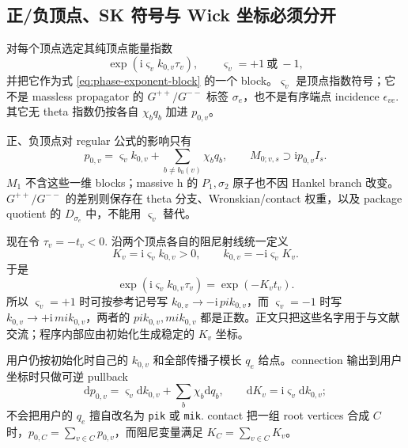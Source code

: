 \documentclass[11pt,a4paper]{ctexart}
\newcommand{\dd}{\mathrm d}
\newcommand{\ii}{\mathrm i}
\begin{document}
\subsection{正/负顶点、SK 符号与 Wick 坐标必须分开}

对每个顶点选定其纯顶点能量指数
\begin{equation}
 \exp(\ii\varsigma_vk_{0,v}\tau_v),
 \qquad \varsigma_v=+1\ \text{或}\ -1,
 \label{eq:vertex-phase-sign}
\end{equation}
并把它作为式 \eqref{eq:phase-exponent-block} 的一个 block。$\varsigma_v$ 是顶点指数符号；它不是 massless propagator 的 $G^{++}/G^{--}$ 标签 $\sigma_e$，也不是有序端点 incidence $\epsilon_{ve}$. 其它无 theta 指数仍按各自 $\chi_bq_b$ 加进 $p_{0,v}$。

正、负顶点对 regular 公式的影响只有
\begin{equation}
 p_{0,v}=\varsigma_vk_{0,v}+\sum_{b\neq b_0(v)}\chi_bq_b,
 \qquad
 M_{0;v,s}\supset\ii p_{0,v}I_s.
 \label{eq:signed-vertex-M0}
\end{equation}
$M_1$ 不含这些一维 blocks；massive h 的 $P_1,\sigma_2$ 原子也不因 Hankel branch 改变。$G^{++}/G^{--}$ 的差别则保存在 theta 分支、Wronskian/contact 权重，以及 package quotient 的 $D_{\sigma_e}$ 中，不能用 $\varsigma_v$ 替代。

现在令 $\tau_v=-t_v<0$. 沿两个顶点各自的阻尼射线统一定义
\begin{equation}
 K_v=\ii\varsigma_vk_{0,v}>0,
 \qquad
 k_{0,v}=-\ii\varsigma_vK_v.
 \label{eq:unified-vertex-wick-coordinate}
\end{equation}
于是
\begin{equation}
 \exp(\ii\varsigma_vk_{0,v}\tau_v)=\exp(-K_vt_v).
\end{equation}
所以 $\varsigma_v=+1$ 时可按参考记号写 $k_{0,v}\to-\ii\,pik_{0,v}$，而 $\varsigma_v=-1$ 时写 $k_{0,v}\to+\ii\,mik_{0,v}$，两者的 $pik_{0,v},mik_{0,v}$ 都是正数。正文只把这些名字用于与文献交流；程序内部应由初始化生成稳定的 $K_v$ 坐标。

用户仍按初始化时自己的 $k_{0,v}$ 和全部传播子模长 $q_e$ 给点。connection 输出到用户坐标时只做可逆 pullback
\begin{equation}
 \dd p_{0,v}=\varsigma_v\dd k_{0,v}+\sum_b\chi_b\dd q_b,
 \qquad
 \dd K_v=\ii\varsigma_v\dd k_{0,v};
 \label{eq:user-to-internal-coordinate-pullback}
\end{equation}
不会把用户的 $q_e$ 擅自改名为 \texttt{pik} 或 \texttt{mik}. contact 把一组 root vertices 合成 $C$ 时，$p_{0,C}=\sum_{v\in C}p_{0,v}$，而阻尼变量满足 $K_C=\sum_{v\in C}K_v$。
\end{document}
